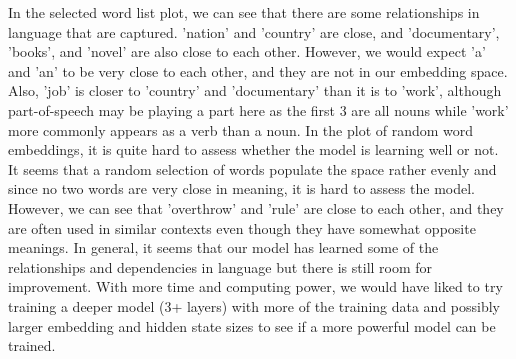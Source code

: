 \documentclass[a4paper]{article}
\begin{document}
In the selected word list plot, we can see that there are some relationships in language that are captured. 'nation' and 'country' are close, and 'documentary', 'books', and 'novel' are also close to each other. However, we would expect 'a' and 'an' to be very close to each other, and they are not in our embedding space. Also, 'job' is closer to 'country' and 'documentary' than it is to 'work', although part-of-speech may be playing a part here as the first 3 are all nouns while 'work' more commonly appears as a verb than a noun. 
\newline
\newline
In the plot of random word embeddings, it is quite hard to assess whether the model is learning well or not. It seems that a random selection of words populate the space rather evenly and since no two words are very close in meaning, it is hard to assess the model. However, we can see that 'overthrow' and 'rule' are close to each other, and they are often used in similar contexts even though they have somewhat opposite meanings.
\newline
\newline
In general, it seems that our model has learned some of the relationships and dependencies in language but there is still room for improvement. With more time and computing power, we would have liked to try training a deeper model (3+ layers) with more of the training data and possibly larger embedding and hidden state sizes to see if a more powerful model can be trained.  
\end{document}

